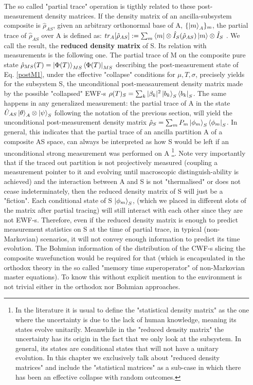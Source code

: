 \documentclass[11pt, a4paper]{article} %
\begin{document}
The so called "partial trace" operation is tigthly related to these post-measurement density matrices. If the density matrix of an ancilla-subsystem composite is $\hat{\rho}_{AS}$, given an arbitrary orthonormal base of A, $\{\ket{m}_A\}_m$, the partial trace of $\hat{\rho}_{AS}$ over A is defined as: $tr_{A}[\hat{\rho}_{AS}] := \sum_m \bra{m}\otimes \hat{I}_S(\hat{\rho}_{AS})\ket{m}\otimes \hat{I}_S$ \cite{Generalized, Durr}. We call the result, the {\bf reduced density matrix} of S. Its relation with measurements is the following one. The partial trace of M on the composite pure state $\hat{\rho}_{MS}(T)=\ket{\Phi(T)}_{MS}\bra{\Phi(T)}_{MS}$ describing the post-measurement state of Eq. \eqref{postM1}, under the effective "collapse" conditions for $\mu,T,\sigma$, precisely yields for the subsystem S, the unconditional post-measaurement density matrix made by the possible "collapsed" EWF-s $\rho(T)_S=\sum_k |\beta_k|^2\ket{b_k}_S\bra{b_k}_S$. The same happens in any generalized measurement: the partial trace of A in the state $\hat{U}_{AS}\ket{\theta}_A\otimes\ket{\psi}_S$ following the notation of the previous section, will yield the unconditional post-measurement density matrix $\hat{\rho}_S=\sum_m P_m \ket{\phi_m}_S\bra{\phi_m}_S$. In general, this indicates that the partial trace of an ancilla partition A of a composite AS space, can always be interpreted as how S would be left if an unconditional strong measurement was performed on A \cite{Generalized}\footnote{In the literature \cite{density} it is usual to define the "statistical density matrix" as the one where the uncertainty is due to the lack of human knowledge, meaning its states evolve unitarily. Meanwhile in the "reduced density matrix" the uncertainty has its origin in the fact that we only look at the subsystem. In general, its states are conditional states that will not have a unitary evolution. In this chapter we exclusively talk about "reduced density matrices" and include the "statistical matrices" as a sub-case in which there has been an effective collapse with random outcomes.}. Note very importantly that if the traced out partition is not projectively measured (coupling a measurement pointer to it and evolving until macroscopic distinguish-ability is achieved) and the interaction between A and S is not "thermalised" or does not cease indeterminately, then the reduced density matrix of S will just be a "fiction". Each conditional state of S $\ket{\phi_m}_S$, (which we placed in different slots of the matrix after partial tracing) will still interact with each other since they are not EWF-s. Therefore, even if the reduced density matrix is enough to predict measurement statistics on S at the time of partial trace, in typical (non-Markovian) scenarios, it will not convey enough information to predict its time evolution. The Bohmian information of the distribution of the CWF-s slicing the composite wavefunction would be required for that (which is encapsulated in the orthodox theory in the so called "memory	time superoperator" \cite{WisemanSSE} of non-Markovian master equations). To know this without explicit mention to the environment is not trivial either in the orthodox nor Bohmian approaches.\vspace{-0.2cm}
\end{document}
